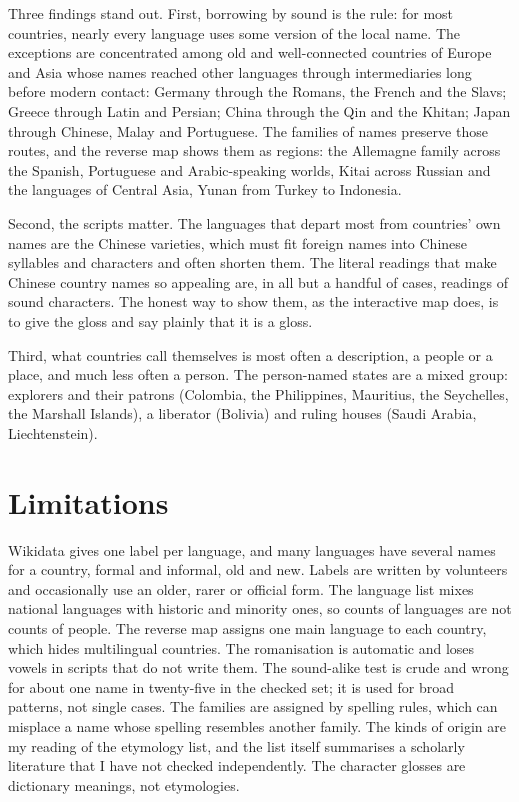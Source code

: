 \documentclass[11pt,a4paper]{article}
\begin{document}
Three findings stand out. First, borrowing by sound is the rule: for most countries, nearly every language uses some version of the local name. The exceptions are concentrated among old and well-connected countries of Europe and Asia whose names reached other languages through intermediaries long before modern contact: Germany through the Romans, the French and the Slavs; Greece through Latin and Persian; China through the Qin and the Khitan; Japan through Chinese, Malay and Portuguese. The families of names preserve those routes, and the reverse map shows them as regions: the Allemagne family across the Spanish, Portuguese and Arabic-speaking worlds, Kitai across Russian and the languages of Central Asia, Yunan from Turkey to Indonesia.

Second, the scripts matter. The languages that depart most from countries' own names are the Chinese varieties, which must fit foreign names into Chinese syllables and characters and often shorten them. The literal readings that make Chinese country names so appealing are, in all but a handful of cases, readings of sound characters. The honest way to show them, as the interactive map does, is to give the gloss and say plainly that it is a gloss.

Third, what countries call themselves is most often a description, a people or a place, and much less often a person. The person-named states are a mixed group: explorers and their patrons (Colombia, the Philippines, Mauritius, the Seychelles, the Marshall Islands), a liberator (Bolivia) and ruling houses (Saudi Arabia, Liechtenstein).

\section{Limitations}

Wikidata gives one label per language, and many languages have several names for a country, formal and informal, old and new. Labels are written by volunteers and occasionally use an older, rarer or official form. The language list mixes national languages with historic and minority ones, so counts of languages are not counts of people. The reverse map assigns one main language to each country, which hides multilingual countries. The romanisation is automatic and loses vowels in scripts that do not write them. The sound-alike test is crude and wrong for about one name in twenty-five in the checked set; it is used for broad patterns, not single cases. The families are assigned by spelling rules, which can misplace a name whose spelling resembles another family. The kinds of origin are my reading of the etymology list, and the list itself summarises a scholarly literature that I have not checked independently. The character glosses are dictionary meanings, not etymologies.
\end{document}
